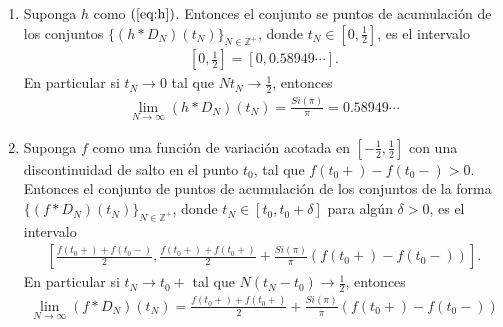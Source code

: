 \begin{theorem}
  \begin{enumerate}
    \item Suponga $h$ como $(\ref{eq:h})$. Entonces el conjunto se puntos de acumulación de los conjuntos $\{(h*D_{N})(t_N)\}_{N\in\mathbb{Z}^{+}}$, donde $t_N\in[0,\frac{1}{2}]$, es el intervalo
      \begin{align*}
        \left[0,\frac{1}{2}\right]=[0,0.58949\cdots].
      \end{align*}
      En particular si $t_{N}\to 0$ tal que $Nt_{N}\to \frac{1}{2}$, entonces
      \begin{align*}
        \lim_{N \to \infty}(h*D_{N})(t_N)=\frac{Si(\pi)}{\pi}=0.58949\cdots
      \end{align*}
    \item Suponga $f$ como una función de variación acotada en $[-\frac{1}{2},\frac{1}{2}]$ con una discontinuidad de salto en el punto $t_0$, tal que $f(t_0+)-f(t_0-)>0$. Entonces el conjunto de puntos de acumulación de los conjuntos de la forma $\{(f*D_N)(t_N)\}_{N\in\mathbb{Z}^{+}}$, donde $t_N\in [t_0,t_0+\delta]$ para algún $\delta >0$, es el intervalo
      \begin{align*}
        \left[ \frac{f(t_0+)+f(t_0-)}{2},\frac{f(t_0+)+f(t_0+)}{2}+\frac{Si(\pi)}{\pi}(f(t_0+)-f(t_0-)) \right].
      \end{align*}
      En particular si $t_N\to t_0+$ tal que $N(t_N-t_0)\to\frac{1}{2}$, entonces
      \begin{align*}
        \lim_{N \to \infty}(f*D_{N})(t_N)=\frac{f(t_0+)+f(t_0+)}{2}+\frac{Si(\pi)}{\pi}(f(t_0+)-f(t_0-))
      \end{align*}
  \end{enumerate}
\end{theorem}
